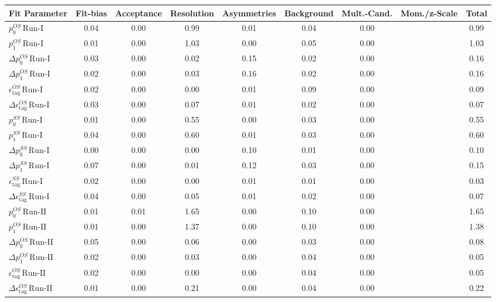 \begin{tabular}{l  c  c  c  c  c  c  c  | c }
\hline
\hline
Fit Parameter & Fit-bias & Acceptance & Resolution & Asymmetries & Background & Mult.-Cand. & Mom./z-Scale &  Total  \\ 
\hline
$p_{0}^{OS} \, \text{Run-I}$ & 0.04 & 0.00 & 0.99 & 0.01 & 0.04 & 0.00 &  & 0.99 \\ 
$p_{1}^{OS} \, \text{Run-I}$ & 0.01 & 0.00 & 1.03 & 0.00 & 0.05 & 0.00 &  & 1.03 \\ 
$\Delta p_{0}^{OS} \, \text{Run-I}$ & 0.03 & 0.00 & 0.02 & 0.15 & 0.02 & 0.00 &  & 0.16 \\ 
$\Delta p_{1}^{OS} \, \text{Run-I}$ & 0.02 & 0.00 & 0.03 & 0.16 & 0.02 & 0.00 &  & 0.16 \\ 
$\epsilon_{\text{tag}}^{OS} \, \text{Run-I}$ & 0.02 & 0.00 & 0.00 & 0.01 & 0.09 & 0.00 &  & 0.09 \\ 
$\Delta \epsilon_{\text{tag}}^{OS} \, \text{Run-I}$ & 0.03 & 0.00 & 0.07 & 0.01 & 0.02 & 0.00 &  & 0.07 \\ 
$p_{0}^{SS} \, \text{Run-I}$ & 0.01 & 0.00 & 0.55 & 0.00 & 0.03 & 0.00 &  & 0.55 \\ 
$p_{1}^{SS} \, \text{Run-I}$ & 0.04 & 0.00 & 0.60 & 0.01 & 0.03 & 0.00 &  & 0.60 \\ 
$\Delta p_{0}^{SS} \, \text{Run-I}$ & 0.00 & 0.00 & 0.00 & 0.10 & 0.01 & 0.00 &  & 0.10 \\ 
$\Delta p_{1}^{SS} \, \text{Run-I}$ & 0.07 & 0.00 & 0.01 & 0.12 & 0.03 & 0.00 &  & 0.15 \\ 
$\epsilon_{\text{tag}}^{SS} \, \text{Run-I}$ & 0.02 & 0.00 & 0.00 & 0.01 & 0.01 & 0.00 &  & 0.03 \\ 
$\Delta \epsilon_{\text{tag}}^{SS} \, \text{Run-I}$ & 0.04 & 0.00 & 0.05 & 0.01 & 0.02 & 0.00 &  & 0.07 \\ 
$p_{0}^{OS} \, \text{Run-II}$ & 0.01 & 0.01 & 1.65 & 0.00 & 0.10 & 0.00 &  & 1.65 \\ 
$p_{1}^{OS} \, \text{Run-II}$ & 0.01 & 0.00 & 1.37 & 0.00 & 0.10 & 0.00 &  & 1.38 \\ 
$\Delta p_{0}^{OS} \, \text{Run-II}$ & 0.05 & 0.00 & 0.06 & 0.00 & 0.03 & 0.00 &  & 0.08 \\ 
$\Delta p_{1}^{OS} \, \text{Run-II}$ & 0.02 & 0.00 & 0.03 & 0.00 & 0.04 & 0.00 &  & 0.05 \\ 
$\epsilon_{\text{tag}}^{OS} \, \text{Run-II}$ & 0.02 & 0.00 & 0.00 & 0.00 & 0.04 & 0.00 &  & 0.05 \\ 
$\Delta \epsilon_{\text{tag}}^{OS} \, \text{Run-II}$ & 0.01 & 0.00 & 0.21 & 0.00 & 0.04 & 0.00 &  & 0.22 \\ 

\end{tabular}
